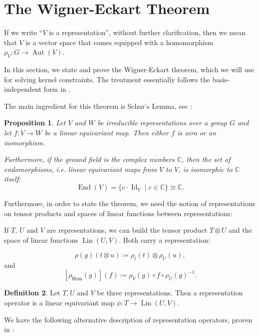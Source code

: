\documentclass[12pt, a4paper]{article}
\theoremstyle{plain}
\newtheorem{pro}{Proposition}[section]
\theoremstyle{definition}
\newtheorem{dfn}[pro]{Definition}
\theoremstyle{remark}
\newcommand{\C}{\mathds{C}}
\DeclareMathOperator{\lin}{Lin}
\DeclareMathOperator{\aut}{Aut}
\DeclareMathOperator{\End}{End}
\DeclareMathOperator{\Id}{Id}
\begin{document}
\section{The Wigner-Eckart Theorem}

If we write ``$V$ is a representation'', without further clarification, then we mean that $V$ is a vector space that comes equipped with a homomorphism $\rho_V: G \to \aut (V)$.

In this section, we state and prove the Wigner-Eckart theorem, which we will use for solving kernel constraints. The treatment essentially follows the basis-independent form in \cite{wigner-eckart}.

The main ingredient for this theorem is Schur's Lemma, see \cite{Jeevanjee}:

\begin{pro}\label{Schur}
Let $V$ and $W$ be irreducible representations over a group $G$ and let $f: V \to W$ be a linear equivariant map. Then either $f$ is zero or an isomorphism.

Furthermore, if the ground field is the complex numbers $\C$, then the set of endomorphisms, i.e. linear equivariant maps from $V$ to $V$, is isomorphic to $\C$ itself:
\begin{equation*}
\End(V) = \{c \cdot \Id_V \mid c \in \C\} \cong \C.
\end{equation*}
\end{pro}

Furthermore, in order to state the theorem, we need the notion of representations on tensor products and spaces of linear functions between representations:

If $T$, $U$ and $V$ are representations, we can build the tensor product $T \otimes U$ and the space of linear functions $\lin(U, V)$. Both carry a representation:

\begin{equation*}
\rho(g)(t \otimes u) \coloneqq \rho_t(t) \otimes \rho_U(u),
\end{equation*}
and
\begin{equation*}
\left[\rho_{\text{Hom}}(g)\right](f) \coloneq \rho_V(g) \circ f \circ \rho_U(g)^{-1}.
\end{equation*}

\begin{dfn}
Let $T, U$ and $V$ be three representations. Then a representation operator is a linear equivariant map $\phi: T \to \lin(U, V)$.
\end{dfn}

We have the following alternative description of representation operators, proven in \cite{wigner-eckart}:
\end{document}
